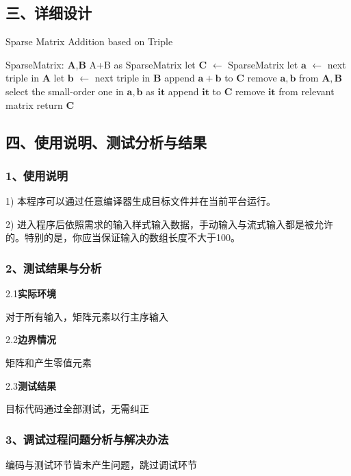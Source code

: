 \documentclass[UTF8, a4paper]{ctexart}
\begin{document}
\subsection*{三、详细设计}
\begin{algorithm}
\begin{algorithmic}[1]
\caption{Sparse Matrix Addition based on Triple}
\Require SparseMatrix: $\mathbf{A}$,$\mathbf{B}$
\Ensure A+B as SparseMatrix
\State let $\mathbf{C}$ $\leftarrow$ SparseMatrix
	\State let $\mathbf{a}$ $\leftarrow$ next triple in $\mathbf{A}$
	\State let $\mathbf{b}$ $\leftarrow$ next triple in $\mathbf{B}$
			\State append $\mathbf{a}+\mathbf{b}$ to $\mathbf{C}$
		\EndIf
		\State remove $\mathbf{a},\mathbf{b}$ from $\mathbf{A},\mathbf{B}$
	\Else
		\State select the small-order one in $\mathbf{a},\mathbf{b}$ as $\mathbf{it}$
		\State append $\mathbf{it}$ to $\mathbf{C}$
		\State remove $\mathbf{it}$ from relevant matrix
	\EndIf
\EndWhile
\State return $\mathbf{C}$
\end{algorithmic}
\end{algorithm}

\subsection*{四、使用说明、测试分析与结果}
\subsubsection*{1、使用说明}
1) 本程序可以通过任意编译器生成目标文件并在当前平台运行。 \par
2) 进入程序后依照需求的输入样式输入数据，手动输入与流式输入都是被允许的。特别的是，你应当保证输入的数组长度不大于100。 \par
\subsubsection*{2、测试结果与分析}
2.1\;\textbf{实际环境} \par
对于所有输入，矩阵元素以行主序输入\par
2.2\;\textbf{边界情况} \par
矩阵和产生零值元素 \par
2.3\;\textbf{测试结果} \par
目标代码通过全部测试，无需纠正
\subsubsection*{3、调试过程问题分析与解决办法}
编码与测试环节皆未产生问题，跳过调试环节
\end{document}
